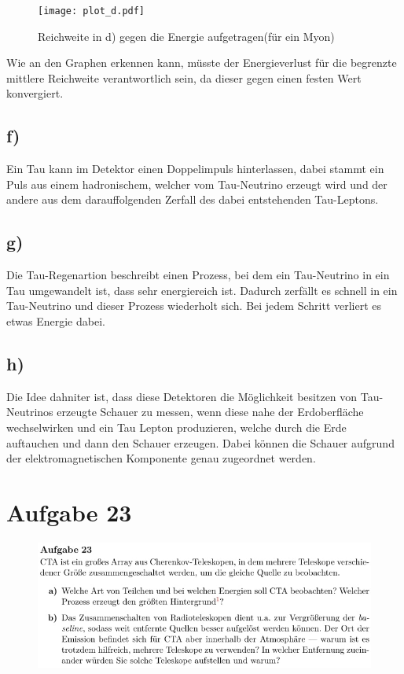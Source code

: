 \begin{figure}[H]
    \centering
    \texttt{[image: plot\_d.pdf]}
    \caption{Reichweite in d) gegen die Energie aufgetragen(für ein Myon)}
\end{figure}

Wie an den Graphen erkennen kann, müsste der Energieverlust für die begrenzte 
mittlere Reichweite verantwortlich sein, da dieser gegen einen festen Wert konvergiert.


\subsection{f)} \justifying
Ein Tau kann im Detektor einen Doppelimpuls hinterlassen, dabei stammt ein Puls
aus einem hadronischem, welcher vom Tau-Neutrino erzeugt wird und der andere aus dem darauffolgenden Zerfall des dabei
entstehenden Tau-Leptons.

\subsection{g)}
Die Tau-Regenartion beschreibt einen Prozess, bei dem ein Tau-Neutrino in ein
Tau umgewandelt ist, dass sehr energiereich ist. Dadurch zerfällt es schnell
in ein Tau-Neutrino und dieser Prozess wiederholt sich. Bei jedem Schritt 
verliert es etwas Energie dabei.

\subsection{h)}
Die Idee dahniter ist, dass diese Detektoren die Möglichkeit besitzen von 
Tau-Neutrinos erzeugte Schauer zu messen, wenn diese nahe der Erdoberfläche wechselwirken
und ein Tau Lepton produzieren, welche durch die Erde auftauchen und dann den Schauer
erzeugen. Dabei können die Schauer aufgrund der elektromagnetischen Komponente genau zugeordnet 
werden.


\section{Aufgabe 23}

    \begin{figure}[H]
        \centering
        \includegraphics[width=\textwidth]{images/Aufgabe23a.jpg}
        \label{fig:3}
    \end{figure}

